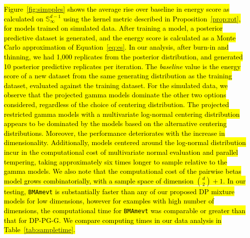 \documentclass[iicol,sn-basic]{sn-jnl}
\theoremstyle{thmstyleone}
\begin{document}
\hl{Figure~\mbox{\ref{fig:simpples}} shows the average rise over baseline in energy score as calculated on $\mathbb{S}_{\infty}^{d-1}$ using the kernel metric described in Proposition~\mbox{\ref{prop:rot}}, for models trained on simulated data.  After training a model, a posterior predictive dataset is generated, and the energy score is calculated as a Monte Carlo approximation of Equation~\mbox{\ref{eq:es}}.  In our analysis, after burn-in and thinning, we had 1,000 replicates from the posterior distribution, and generated 10 posterior predictive replicates per iteration. The \emph{baseline} value is the energy score of a new dataset from the same generating distribution as the training dataset, evaluated against the training dataset.  For the simulated data, we observe that the projected gamma models dominate the other two options considered, regardless of the choice of centering distribution.  The  projected restricted gamma models with a multivariate log-normal centering distribution appears to be dominated by the models based on the alternative centering distributions. Moreover, the performance deteriorates with the increase in dimensionality. Additionally, models centered around the log-normal distribution incur in the computational cost of multivariate normal evaluation and parallel tempering, taking approximately six times longer to sample relative to the gamma models.  We also note that the computational cost  of the pairwise betas model grows combinatorially, with a sample space of dimension $\binom{d}{2} + 1$. In our testing, \texttt{BMAmevt} is substantially faster than any of our proposed DP mixture models for low dimensions, however for examples with high number of dimensions, the computational time for \texttt{BMAmevt} was comparable or greater than that for DP-PG-G.  We compare computing times in our data analysis in Table~\mbox{\ref{tab:sampletime}}.}
\end{document}
